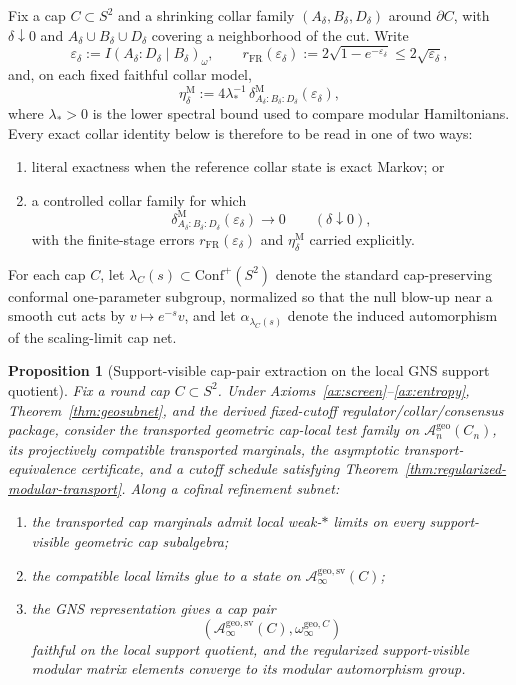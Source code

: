 \documentclass[11pt]{article}
\newtheorem{proposition}[theorem]{Proposition}
\newcommand{\Conf}{\mathrm{Conf}}
\begin{document}
Fix a cap \(C\subset S^2\) and a shrinking collar family \((A_\delta,B_\delta,D_\delta)\) around \(\partial C\), with \(\delta\downarrow 0\) and \(A_\delta\cup B_\delta\cup D_\delta\) covering a neighborhood of the cut. Write
\[
\varepsilon_\delta:=I(A_\delta:D_\delta\mid B_\delta)_\omega,
\qquad
r_{\mathrm{FR}}(\varepsilon_\delta):=
2\sqrt{1-e^{-\varepsilon_\delta}}
\le 2\sqrt{\varepsilon_\delta},
\]
and, on each fixed faithful collar model,
\[
\eta_\delta^{\mathrm M}
:=
4\lambda_\ast^{-1}\,
\delta^{\mathrm M}_{A_\delta:B_\delta:D_\delta}(\varepsilon_\delta),
\]
where \(\lambda_\ast>0\) is the lower spectral bound used to compare modular Hamiltonians. Every exact collar identity below is therefore to be read in one of two ways:
\begin{enumerate}[leftmargin=2em]
\item literal exactness when the reference collar state is exact Markov; or
\item a controlled collar family for which
\[
\delta^{\mathrm M}_{A_\delta:B_\delta:D_\delta}(\varepsilon_\delta)\to 0
\qquad(\delta\downarrow 0),
\]
with the finite-stage errors \(r_{\mathrm{FR}}(\varepsilon_\delta)\) and \(\eta_\delta^{\mathrm M}\) carried explicitly.
\end{enumerate}

For each cap \(C\), let \(\lambda_C(s)\subset \Conf^+(S^2)\) denote the standard cap-preserving conformal one-parameter subgroup, normalized so that the null blow-up near a smooth cut acts by \(v\mapsto e^{-s}v\), and let \(\alpha_{\lambda_C(s)}\) denote the induced automorphism of the scaling-limit cap net.

\begin{proposition}[Support-visible cap-pair extraction on the local GNS support quotient]\label{prop:cap-pair-extraction}
Fix a round cap \(C\subset S^2\). Under Axioms~\ref{ax:screen}--\ref{ax:entropy}, Theorem~\ref{thm:geosubnet}, and the derived fixed-cutoff regulator/collar/consensus package, consider the transported geometric cap-local test family on \(\mathcal A_n^{\mathrm{geo}}(C_n)\), its projectively compatible transported marginals, the asymptotic transport-equivalence certificate, and a cutoff schedule satisfying Theorem~\ref{thm:regularized-modular-transport}. Along a cofinal refinement subnet:
\begin{enumerate}[label=\textup{(\roman*)},leftmargin=2em]
\item the transported cap marginals admit local weak-\(*\) limits on every support-visible geometric cap subalgebra;
\item the compatible local limits glue to a state on \(\mathcal A_\infty^{\mathrm{geo,sv}}(C)\);
\item the GNS representation gives a cap pair
\[
(\mathcal A_\infty^{\mathrm{geo,sv}}(C),\omega_\infty^{\mathrm{geo},C})
\]
faithful on the local support quotient, and the regularized support-visible modular matrix elements converge to its modular automorphism group.
\end{enumerate}
\end{proposition}
\end{document}
